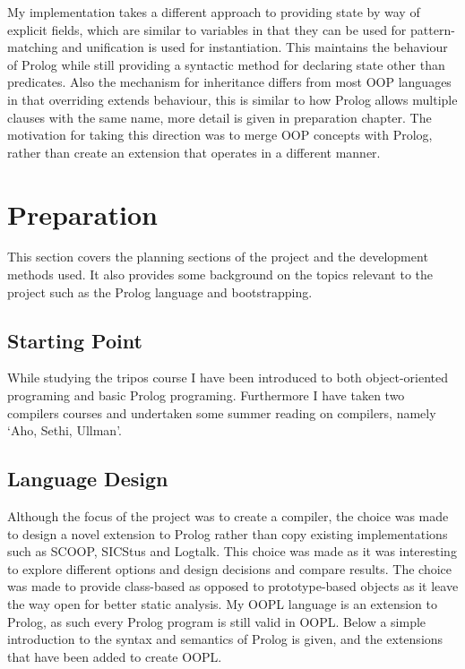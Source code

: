 \documentclass[12pt,a4paper,twoside,openright]{report}
\begin{document}
\bigskip

My implementation takes a different approach to providing state by way of explicit fields, which are similar to variables in that they can be used for pattern-matching and unification is used for instantiation. This maintains the behaviour of Prolog while still providing a syntactic method for declaring state other than predicates. Also the mechanism for inheritance differs from most OOP languages in that overriding extends behaviour, this is similar to how Prolog allows multiple clauses with the same name, more detail is given in preparation chapter. The motivation for taking this direction was to merge OOP concepts with Prolog, rather than create an extension that operates in a different manner.

\chapter{Preparation}

This section covers the planning sections of the project and the development methods used. It also provides some background on the topics relevant to the project such as the Prolog language and bootstrapping.

\section{Starting Point}

While studying the tripos course I have been introduced to both object-oriented programing and basic Prolog programing. Furthermore I have taken two compilers courses and undertaken some summer reading on compilers, namely `Aho, Sethi, Ullman'\cite{DRAGON}.

\section {Language Design}
\label{sec:lang}
Although the focus of the project was to create a compiler, the choice was made to design a novel extension to Prolog rather than copy existing implementations such as SCOOP, SICStus and Logtalk. This choice was made as it was interesting to explore different options and design decisions and compare results. The choice was made to provide class-based as opposed to prototype-based objects as it leave the way open for better static analysis. My OOPL language is an extension to Prolog, as such every Prolog program is still valid in OOPL. Below a simple introduction to the syntax and semantics of Prolog is given, and the extensions that have been added to create OOPL.
\end{document}
